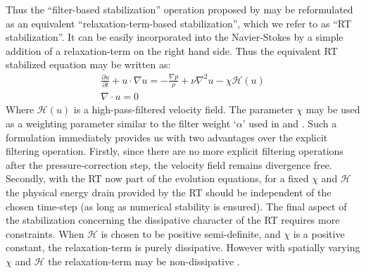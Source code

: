 Thus the ``filter-based stabilization'' operation proposed by \cite{fischer01} may be reformulated as an equivalent ``relaxation-term-based stabilization'', which we refer to as ``RT stabilization''. It can be easily incorporated into the Navier-Stokes by a simple addition of a relaxation-term on the right hand side. Thus the equivalent RT stabilized equation may be written as:
\begin{align}
\frac{\partial u}{\partial t} + u\cdot\nabla u = -\frac{\nabla p}{\rho} + \nu\nabla^{2}u -\chi\mathcal{H}(u) \\
\nabla\cdot u = 0
\label{eqn:rt_NS}
\end{align}
Where $\mathcal{H}(u)$ is a high-pass-filtered velocity field. The parameter $\chi$ may be used as a weighting parameter similar to the filter weight `$\alpha$' used in \cite{fischer01} and \cite{malm13}. Such a formulation immediately provides us with two advantages over the explicit filtering operation. Firstly, since there are no more explicit filtering operations after the pressure-correction step, the velocity field remains divergence free. Secondly, with the RT now part of the evolution equations, for a fixed $\chi$ and $\mathcal{H}$ the physical energy drain provided by the RT should be independent of the chosen time-step (as long as numerical stability is ensured). The final aspect of the stabilization concerning the dissipative character of the RT requires more constraints. When $\mathcal{H}$ is chosen to be positive semi-definite, and $\chi$ is a positive constant, the relaxation-term is purely dissipative. However with spatially varying $\chi$ and $\mathcal{H}$ the relaxation-term may be non-dissipative \citep{stolz03}.
